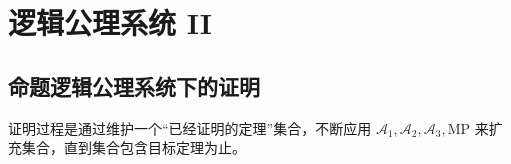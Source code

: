 \section{逻辑公理系统 II}

\subsection{命题逻辑公理系统下的证明}

证明过程是通过维护一个“已经证明的定理”集合，不断应用 $\mathscr{A}_1, \mathscr{A}_2, \mathscr{A}_3, \mathrm{MP}$ 来扩充集合，直到集合包含目标定理为止。

